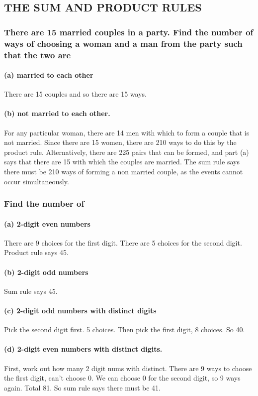 \subsection{THE SUM AND PRODUCT RULES}
\subsubsection*{There are 15 married couples in a party. Find the number of ways of choosing a woman and a man
from the party such that the two are}
\paragraph*{(a) married to each other}
There are 15 couples and so there are 15 ways.
\paragraph*{(b) not married to each other.}
For any particular woman, there are 14 men with which to form a couple that is not married.
Since there are 15 women, there are 210 ways to do this by the product rule. Alternatively, there are 225 pairs that can be formed, and part (a) says that there are 15 with which the couples are married. The sum rule says there must be 210 ways of forming a non married couple, as the events cannot occur simultaneously.
\subsubsection*{Find the number of}
\paragraph*{(a) 2-digit even numbers}
There are 9 choices for the first digit. There are 5 choices for the second digit. Product rule says 45.
\paragraph*{(b) 2-digit odd numbers}
Sum rule says 45.
\paragraph*{(c) 2-digit odd numbers with
distinct digits}
Pick the second digit first. 5 choices. Then pick the first digit, 8 choices. So 40.
\paragraph*{(d) 2-digit even numbers with distinct digits.}
First, work out how many 2 digit nums with distinct. There are 9 ways to choose the first digit, can't choose 0. We can choose 0 for the second digit, so 9 ways again. Total 81. So sum rule says there must be 41.


